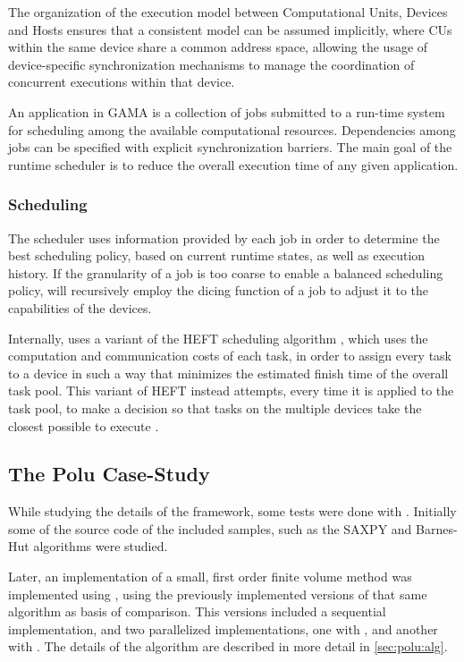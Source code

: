 \documentclass[main.tex]{subfiles}
\begin{document}
The organization of the execution model between Computational Units, Devices and Hosts ensures that a consistent model can be assumed implicitly, where \acsp{CU} within the same device share a common address space, allowing the usage of device-specific synchronization mechanisms to manage the coordination of concurrent executions within that device.

An application in GAMA is a collection of jobs submitted to a run-time system for scheduling among the available computational resources. Dependencies among jobs can be specified with explicit synchronization barriers. The main goal of the runtime scheduler is to reduce the overall execution time of any given application.

\subsubsection{Scheduling} \label{sec:gama_sched}

The scheduler uses information provided by each job in order to determine the best scheduling policy, based on current runtime states, as well as execution history. If the granularity of a job is too coarse to enable a balanced scheduling policy, \gama will recursively employ the dicing function of a job to adjust it to the capabilities of the devices.

Internally, \gama uses a variant of the \ac{HEFT} scheduling algorithm \cite{topcuoglu2002performance}, which uses the computation and communication costs of each task, in order to assign every task to a device in such a way that minimizes the estimated finish time of the overall task pool. This variant of \acs{HEFT} instead attempts, every time it is applied to the task pool, to make a decision so that tasks on the multiple devices take the closest possible to execute \cite{thesisMariano12}.


\subsection{The Polu Case-Study}

While studying the details of the framework, some tests were done with \gama. Initially some of the source code of the included samples, such as the SAXPY and Barnes-Hut algorithms were studied.

Later, an implementation of a small, first order finite volume method was implemented using \gama, using the previously implemented versions of that same algorithm as basis of comparison. This versions included a sequential implementation, and two parallelized implementations, one with \openmp, and another with \cuda. The details of the algorithm are described in more detail in \cref{sec:polu:alg}.
\end{document}
